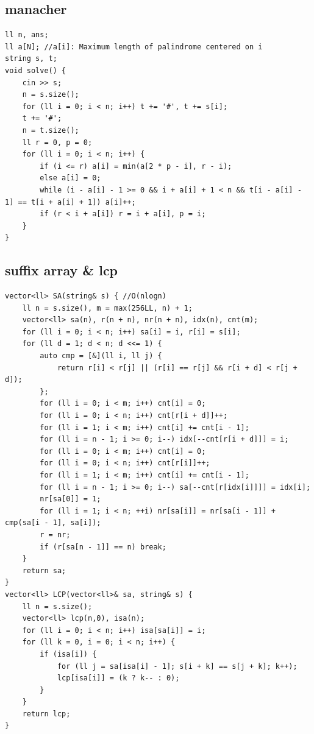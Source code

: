 \documentclass[landscape, 8pt, a4paper, oneside, twocolumn]{extarticle}
\begin{document}
\subsection{manacher}
\begin{verbatim}
ll n, ans;
ll a[N]; //a[i]: Maximum length of palindrome centered on i
string s, t;
void solve() {
    cin >> s;
    n = s.size();
    for (ll i = 0; i < n; i++) t += '#', t += s[i];
    t += '#';
    n = t.size();
    ll r = 0, p = 0;
    for (ll i = 0; i < n; i++) {
        if (i <= r) a[i] = min(a[2 * p - i], r - i);
        else a[i] = 0;
        while (i - a[i] - 1 >= 0 && i + a[i] + 1 < n && t[i - a[i] - 1] == t[i + a[i] + 1]) a[i]++;
        if (r < i + a[i]) r = i + a[i], p = i;
    }
}
\end{verbatim}

\subsection{suffix array \& lcp}
\begin{verbatim}
vector<ll> SA(string& s) { //O(nlogn)
    ll n = s.size(), m = max(256LL, n) + 1;
    vector<ll> sa(n), r(n + n), nr(n + n), idx(n), cnt(m);
    for (ll i = 0; i < n; i++) sa[i] = i, r[i] = s[i];
    for (ll d = 1; d < n; d <<= 1) {
        auto cmp = [&](ll i, ll j) {
            return r[i] < r[j] || (r[i] == r[j] && r[i + d] < r[j + d]);
        };
        for (ll i = 0; i < m; i++) cnt[i] = 0;
        for (ll i = 0; i < n; i++) cnt[r[i + d]]++;
        for (ll i = 1; i < m; i++) cnt[i] += cnt[i - 1];
        for (ll i = n - 1; i >= 0; i--) idx[--cnt[r[i + d]]] = i;
        for (ll i = 0; i < m; i++) cnt[i] = 0;
        for (ll i = 0; i < n; i++) cnt[r[i]]++;
        for (ll i = 1; i < m; i++) cnt[i] += cnt[i - 1];
        for (ll i = n - 1; i >= 0; i--) sa[--cnt[r[idx[i]]]] = idx[i];
        nr[sa[0]] = 1;
        for (ll i = 1; i < n; ++i) nr[sa[i]] = nr[sa[i - 1]] + cmp(sa[i - 1], sa[i]);
        r = nr;
        if (r[sa[n - 1]] == n) break;
    }
    return sa;
}
vector<ll> LCP(vector<ll>& sa, string& s) {
    ll n = s.size();
    vector<ll> lcp(n,0), isa(n);
    for (ll i = 0; i < n; i++) isa[sa[i]] = i;
    for (ll k = 0, i = 0; i < n; i++) {
        if (isa[i]) {
            for (ll j = sa[isa[i] - 1]; s[i + k] == s[j + k]; k++);
            lcp[isa[i]] = (k ? k-- : 0);
        }
    }
    return lcp;
}
\end{verbatim}
\end{document}
